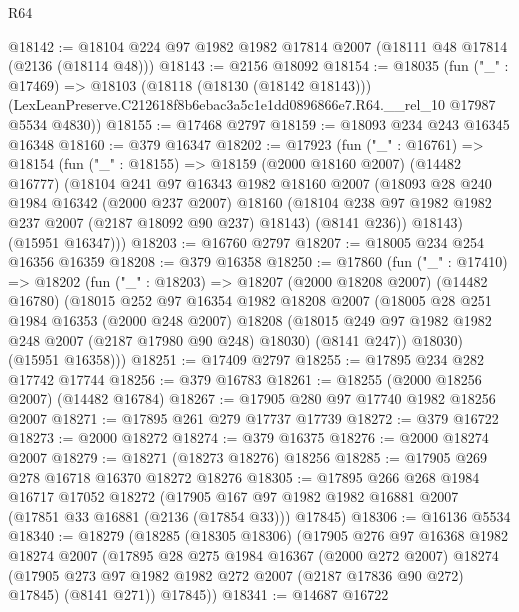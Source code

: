 \begin{lexlean}{R64}
\begin{coremodule}
@18142 := @18104 @224 @97 @1982 @1982 @17814 @2007 (@18111 @48 @17814 (@2136 (@18114 @48)))
@18143 := @2156 @18092
@18154 := @18035
    (fun ("_" : @17469) =>
    @18103
      (@18118 (@18130 (@18142 @18143)))
      (LexLeanPreserve.C212618f8b6ebac3a5c1e1dd0896866e7.R64.__rel_10 @17987 @5534 @4830))
@18155 := @17468 @2797
@18159 := @18093 @234 @243 @16345 @16348
@18160 := @379 @16347
@18202 := @17923
    (fun ("_" : @16761) =>
    @18154
      (fun ("_" : @18155) =>
      @18159
        (@2000 @18160 @2007)
        (@14482 @16777)
        (@18104
          @241
          @97
          @16343
          @1982
          @18160
          @2007
          (@18093
            @28
            @240
            @1984
            @16342
            (@2000 @237 @2007)
            @18160
            (@18104 @238 @97 @1982 @1982 @237 @2007 (@2187 @18092 @90 @237) @18143)
            (@8141 @236))
          @18143)
        (@15951 @16347)))
@18203 := @16760 @2797
@18207 := @18005 @234 @254 @16356 @16359
@18208 := @379 @16358
@18250 := @17860
    (fun ("_" : @17410) =>
    @18202
      (fun ("_" : @18203) =>
      @18207
        (@2000 @18208 @2007)
        (@14482 @16780)
        (@18015
          @252
          @97
          @16354
          @1982
          @18208
          @2007
          (@18005
            @28
            @251
            @1984
            @16353
            (@2000 @248 @2007)
            @18208
            (@18015 @249 @97 @1982 @1982 @248 @2007 (@2187 @17980 @90 @248) @18030)
            (@8141 @247))
          @18030)
        (@15951 @16358)))
@18251 := @17409 @2797
@18255 := @17895 @234 @282 @17742 @17744
@18256 := @379 @16783
@18261 := @18255 (@2000 @18256 @2007) (@14482 @16784)
@18267 := @17905 @280 @97 @17740 @1982 @18256 @2007
@18271 := @17895 @261 @279 @17737 @17739
@18272 := @379 @16722
@18273 := @2000 @18272
@18274 := @379 @16375
@18276 := @2000 @18274 @2007
@18279 := @18271 (@18273 @18276) @18256
@18285 := @17905 @269 @278 @16718 @16370 @18272 @18276
@18305 := @17895
    @266
    @268
    @1984
    @16717
    @17052
    @18272
    (@17905 @167 @97 @1982 @1982 @16881 @2007 (@17851 @33 @16881 (@2136 (@17854 @33))) @17845)
@18306 := @16136 @5534
@18340 := @18279
    (@18285
      (@18305 @18306)
      (@17905
        @276
        @97
        @16368
        @1982
        @18274
        @2007
        (@17895
          @28
          @275
          @1984
          @16367
          (@2000 @272 @2007)
          @18274
          (@17905 @273 @97 @1982 @1982 @272 @2007 (@2187 @17836 @90 @272) @17845)
          (@8141 @271))
        @17845))
@18341 := @14687 @16722

\end{coremodule}
\end{lexlean}
